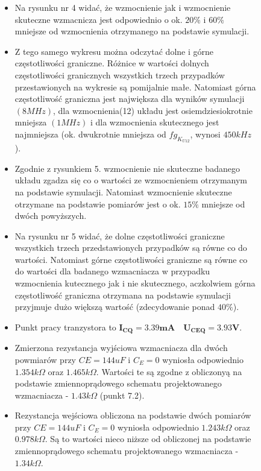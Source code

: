 \documentclass[a4paper,12pt]{article}
\begin{document}
\begin{figure}
\begin{itemize}
  \item Na rysunku nr 4 widać, że wzmocnienie jak i wzmocnienie skuteczne wzmacnicza
	jest odpowiednio o ok. $20\%$ i $60\%$ mniejsze od wzmocnienia
	otrzymanego na podstawie symulacji.
  \item Z tego samego wykresu można odczytać dolne i górne częstotliwości graniczne. 
	Różnice w wartości dolnych częstotliwości granicznych wszystkich trzech przypadków 
	przestawionych na wykresie są pomijalnie małe. Natomiast górna częstotliwość graniczna 
	jest największa dla wyników symulacji $(8MHz)$, dla wzmocnienia(12) układu
	jest osiemdziesiokrotnie mniejsza $(1MHz)$ i dla wzmocnienia skutecznego jest najmniejsza
	(ok. dwukrotnie mniejsza od $fg_{K_{U12}}$, wynosi $450kHz$).
  \item Zgodnie z rysunkiem 5. wzmocnienie nie skuteczne badanego układu zgadza się co o wartości
	ze wzmocnieniem otrzymanym na podstawie symulacji. Natomiast wzmocnienie skuteczne 
	otrzymane na podstawie pomiarów jest o ok. $15\%$ mniejsze od dwóch powyższych.

\end{itemize}
\end{figure}
\pagebreak

\begin{figure}
 \begin{itemize}
    \item Na rysunku nr 5 widać, że dolne częstotliwości graniczne wszystkich trzech przedstawionych
	przypadków są równe co do wartości. Natomiast górne częstotliwości graniczne są równe co do 
	wartości dla badanego wzmacniacza w przypadku wzmocnienia kutecznego jak i nie skutecznego,
	aczkolwiem górna częstotliwość graniczna otrzymana na podstawie symulacji przyjmuje
	dużo większą wartość (zdecydowanie ponad $40\%$).
  \item Punkt pracy tranzystora to $\mathbf{I_{CQ} = 3.39mA \quad U_{CEQ} = 3.93V}$.
  \item Zmierzona rezystancja wyjściowa wzmacniacza dla dwóch powmiarów przy $CE=144uF$
	i $C_E=0$ wyniosła odpowiednio $1.354k\Omega$ oraz $1.465k\Omega$. Wartości te są zgodne
	z obliczonyą na podstawie zmiennoprądowego schematu projektowanego wzmacniacza - $1.43k\Omega$
	(punkt 7.2).
  \item Rezystancja wejściowa obliczona na podstawie dwóch pomiarów przy $CE=144uF$
	i $C_E=0$ wyniosła odpowiednio $1.243k\Omega$ oraz $0.978k\Omega$. Są to wartości nieco niższe
	od obliczonej na podstawie zmiennoprądowego schematu projektowanego wzmacniacza - $1.34k\Omega$.
 \end{itemize}

\end{figure}
\end{document}
